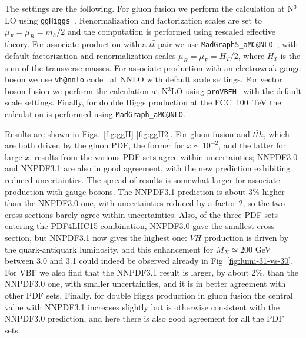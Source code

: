 The settings are the following. 
For  gluon fusion we perform the calculation at N$^3$LO using
{\tt  ggHiggs}~\cite{Ball:2013bra,Bonvini:2014jma,Bonvini:2016frm}.
Renormalization and factorization scales are set to $\mu_F=\mu_R=m_h/2$
and the computation is performed using rescaled effective theory.
For associate production with a $t\bar{t}$ pair we use
{\tt MadGraph5\_aMC@NLO}~\cite{Alwall:2014hca}, with default
factorization and renormalization scales $\mu_R=\mu_F=H_T/2$, where $H_T$ is 
the sum of the transverse masses.
For associate production with an electroweak gauge boson we use
{\tt vh@nnlo} code~\cite{Brein:2012ne} at NNLO with default scale settings.
For  vector boson fusion we perform the calculation at N$^3$LO using
{\tt proVBFH}~\cite{Dreyer:2016oyx,Cacciari:2015jma}
with the default scale settings. Finally, for double Higgs production
at the FCC~100~TeV the calculation is performed using
{\tt MadGraph\_aMC@NLO}. 

Results are shown in Figs.~\ref{fig:ggH}-\ref{fig:ggH2}.
For gluon fusion and $t\bar{t}h$, which are both driven by the gluon PDF, the
former for $x\sim10^{-2}$, and the latter for large $x$, 
results from the various  PDF sets agree within uncertainties;
NNPDF3.0 and NNPDF3.1 are also in good agreement, with the new prediction
exhibiting reduced uncertainties.
The spread of results is somewhat larger for associate production with
gauge bosons.
The NNPDF3.1 prediction is about 3\% higher than the NNPDF3.0 one,
with uncertainties reduced by a factor 2, so the two cross-sections
barely agree within uncertainties. Also, of the three PDF sets
entering the PDF4LHC15 combination, 
NNPDF3.0 gave the smallest cross-section, but NNPDF3.1 now gives the highest
one: $VH$ production is driven by the quark-antiquark luminosity,
and this enhancement for $M_X\simeq 200$ GeV between 3.0 and 3.1
could indeed be observed already in Fig~\ref{fig:lumi-31-vs-30}.
For VBF we also find that the NNPDF3.1 result is larger, by
about 2\%,  than
the NNPDF3.0 one, with smaller
uncertainties, and it is in better  agreement with other PDF sets.
Finally, for double Higgs production in gluon fusion
the central value  with  NNPDF3.1 increases slightly but is otherwise consistent
with the NNPDF3.0 prediction, and
here there  is also good agreement for all the PDF sets.



